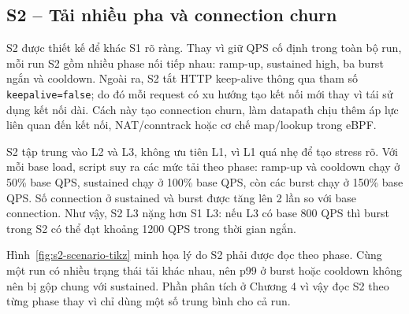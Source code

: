 \subsection{S2 -- Tải nhiều pha và connection churn}

S2 được thiết kế để khác S1 rõ ràng. Thay vì giữ QPS cố định trong toàn bộ run, mỗi run S2 gồm nhiều phase nối tiếp nhau: ramp-up, sustained high, ba burst ngắn và cooldown. Ngoài ra, S2 tắt HTTP keep-alive thông qua tham số \texttt{keepalive=false}; do đó mỗi request có xu hướng tạo kết nối mới thay vì tái sử dụng kết nối dài. Cách này tạo connection churn, làm datapath chịu thêm áp lực liên quan đến kết nối, NAT/conntrack hoặc cơ chế map/lookup trong eBPF.

S2 tập trung vào L2 và L3, không ưu tiên L1, vì L1 quá nhẹ để tạo stress rõ. Với mỗi base load, script suy ra các mức tải theo phase: ramp-up và cooldown chạy ở 50\% base QPS, sustained chạy ở 100\% base QPS, còn các burst chạy ở 150\% base QPS. Số connection ở sustained và burst được tăng lên 2 lần so với base connection. Như vậy, S2 L3 nặng hơn S1 L3: nếu L3 có base 800 QPS thì burst trong S2 có thể đạt khoảng 1200 QPS trong thời gian ngắn.

Hình~\ref{fig:s2-scenario-tikz} minh họa lý do S2 phải được đọc theo phase. Cùng một run có nhiều trạng thái tải khác nhau, nên p99 ở burst hoặc cooldown không nên bị gộp chung với sustained. Phần phân tích ở Chương 4 vì vậy đọc S2 theo từng phase thay vì chỉ dùng một số trung bình cho cả run.

